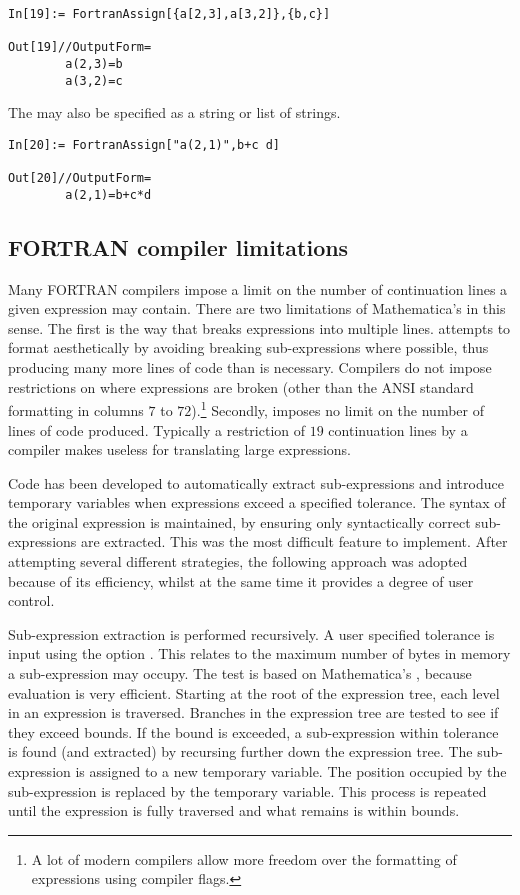 \documentclass [12pt,twoside]{article}
\begin{document}
\begin{verbatim}
In[19]:= FortranAssign[{a[2,3],a[3,2]},{b,c}]

Out[19]//OutputForm=
        a(2,3)=b
        a(3,2)=c
\end{verbatim}
The  may also be specified as a string or list of strings.

\begin{verbatim}
In[20]:= FortranAssign["a(2,1)",b+c d]

Out[20]//OutputForm=
        a(2,1)=b+c*d
\end{verbatim}

\pagebreak[2]

\subsection{FORTRAN compiler limitations}

Many FORTRAN compilers impose a limit on the number of continuation
lines a given expression may contain. There are two limitations of
Mathematica's  in this sense. The first is the way that
 breaks expressions into multiple lines.
 attempts to format aesthetically by avoiding breaking
sub-expressions where possible, thus producing many more lines of code
than is necessary. Compilers do not impose restrictions on where
expressions are broken (other than the ANSI standard formatting in columns $7$ to
$72$).\footnote{A lot of modern compilers allow more freedom over the
formatting of expressions using compiler flags.}
Secondly,  imposes no limit on the number of lines of code
produced. Typically a restriction of $19$ continuation lines by a compiler
makes  useless for translating large expressions.

Code has been developed to automatically extract sub-expressions and
introduce temporary variables when expressions exceed a specified
tolerance. The syntax of the original expression is maintained, by ensuring
only syntactically correct sub-expressions are extracted.
This was the most difficult feature to implement. After attempting
several different strategies, the following approach was adopted because of its
efficiency, whilst at the same time it provides a degree of user control.

Sub-expression extraction is performed recursively. A user specified tolerance
is input using the option . This relates to the maximum
number of bytes in memory a sub-expression may occupy. The test is based on
Mathematica's , because evaluation is very efficient.
Starting at the root of the expression tree, each level in an expression is traversed.
Branches in the expression tree are tested to see if they exceed bounds. If the bound
is exceeded, a sub-expression within tolerance is found (and extracted) by recursing further
down the expression tree. The sub-expression is assigned to a new temporary variable. The
position occupied by the sub-expression is replaced by the temporary variable. This
process is repeated until the expression is fully traversed and what remains is within
bounds.
\end{document}
